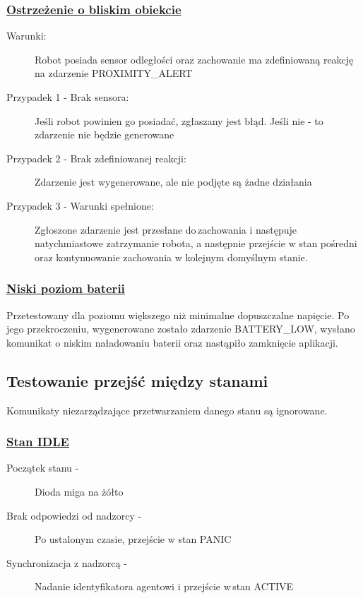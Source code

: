 \subsubsection*{\underline{Ostrzeżenie o bliskim obiekcie}}

\begin{description}
    \item[Warunki:]Robot posiada sensor odległości oraz zachowanie ma zdefiniowaną reakcję na zdarzenie PROXIMITY\_ALERT
    \item[Przypadek 1 - Brak sensora:]Jeśli robot powinien go posiadać, zgłaszany jest błąd. Jeśli nie - to zdarzenie nie będzie generowane
        
    \item[Przypadek 2 - Brak zdefiniowanej reakcji:]Zdarzenie jest wygenerowane, ale nie podjęte są żadne działania
        
    \item[Przypadek 3 - Warunki spełnione:]Zgłoszone zdarzenie jest przesłane do\,zachowania i następuje natychmiastowe zatrzymanie robota, a następnie przejście w stan pośredni oraz kontynuowanie zachowania w kolejnym domyślnym stanie.\\
        
\end{description}

\subsubsection{\underline{Niski poziom baterii}}

Przetestowany dla poziomu większego niż minimalne dopuszczalne napięcie. Po\,jego przekroczeniu, wygenerowane zostało zdarzenie BATTERY\_LOW, wysłano komunikat o niskim naładowaniu baterii oraz nastąpiło zamknięcie aplikacji.

\subsection{Testowanie przejść między stanami}

Komunikaty niezarządzające przetwarzaniem danego stanu są ignorowane.

\subsubsection{\underline{Stan IDLE}}

\begin{description}
    \item[Początek stanu -]Dioda miga na żółto
    \item[Brak odpowiedzi od nadzorcy -]Po ustalonym czasie, przejście w stan PANIC
        
    \item[Synchronizacja z nadzorcą -]Nadanie identyfikatora agentowi i przejście w\,stan ACTIVE
        
\end{description}

